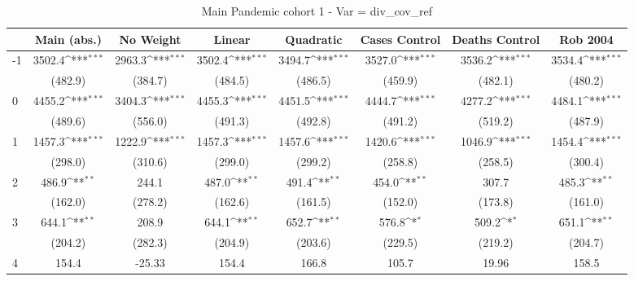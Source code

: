 \documentclass{article}
\begin{document}
{
\def\sym#1{\ifmmode^{#1}\else\(^{#1}\)\fi}
\begin{longtable}{l*{7}{c}}
\caption{Main Pandemic cohort 1 - Var = div\_cov\_ref}\\
\hline\hline\endfirsthead\hline\endhead\hline\endfoot\endlastfoot
                &\multicolumn{1}{c}{Main (abs.)}&\multicolumn{1}{c}{No Weight}&\multicolumn{1}{c}{Linear}&\multicolumn{1}{c}{Quadratic}&\multicolumn{1}{c}{Cases Control}&\multicolumn{1}{c}{Deaths Control}&\multicolumn{1}{c}{Rob 2004}\\
\hline
-1              &   3502.4\sym{***}&   2963.3\sym{***}&   3502.4\sym{***}&   3494.7\sym{***}&   3527.0\sym{***}&   3536.2\sym{***}&   3534.4\sym{***}\\
                &  (482.9)         &  (384.7)         &  (484.5)         &  (486.5)         &  (459.9)         &  (482.1)         &  (480.2)         \\
0               &   4455.2\sym{***}&   3404.3\sym{***}&   4455.3\sym{***}&   4451.5\sym{***}&   4444.7\sym{***}&   4277.2\sym{***}&   4484.1\sym{***}\\
                &  (489.6)         &  (556.0)         &  (491.3)         &  (492.8)         &  (491.2)         &  (519.2)         &  (487.9)         \\
1               &   1457.3\sym{***}&   1222.9\sym{***}&   1457.3\sym{***}&   1457.6\sym{***}&   1420.6\sym{***}&   1046.9\sym{***}&   1454.4\sym{***}\\
                &  (298.0)         &  (310.6)         &  (299.0)         &  (299.2)         &  (258.8)         &  (258.5)         &  (300.4)         \\
2               &    486.9\sym{**} &    244.1         &    487.0\sym{**} &    491.4\sym{**} &    454.0\sym{**} &    307.7         &    485.3\sym{**} \\
                &  (162.0)         &  (278.2)         &  (162.6)         &  (161.5)         &  (152.0)         &  (173.8)         &  (161.0)         \\
3               &    644.1\sym{**} &    208.9         &    644.1\sym{**} &    652.7\sym{**} &    576.8\sym{*}  &    509.2\sym{*}  &    651.1\sym{**} \\
                &  (204.2)         &  (282.3)         &  (204.9)         &  (203.6)         &  (229.5)         &  (219.2)         &  (204.7)         \\
4               &    154.4         &   -25.33         &    154.4         &    166.8         &    105.7         &    19.96         &    158.5         \\

\end{longtable}}
\end{document}
